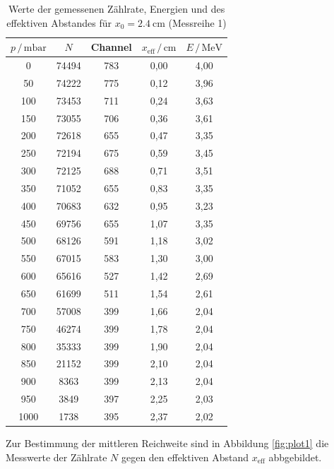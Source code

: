 \begin{table}
  \centering
  \caption{Werte der gemessenen Zählrate, Energien und des effektiven Abstandes für 
            $x_0 = \SI{2.4}{\centi\meter}$ (Messreihe 1)}
  \label{tab:mess1}
  \begin{tabular}{c c c c c}
  \toprule
  $p \,/\, \si{\milli\bar}$ & $N$ & Channel & $x_\text{eff} \,/\, \si {\centi\meter}$ & 
  $E \,/\, \si{\mega\eV}$\\
  \midrule 
         0 & 74494 & 783 & 0,00 & 4,00 \\
        50 & 74222 & 775 & 0,12 & 3,96 \\
       100 & 73453 & 711 & 0,24 & 3,63 \\
       150 & 73055 & 706 & 0,36 & 3,61 \\
       200 & 72618 & 655 & 0,47 & 3,35 \\
       250 & 72194 & 675 & 0,59 & 3,45 \\
       300 & 72125 & 688 & 0,71 & 3,51 \\
       350 & 71052 & 655 & 0,83 & 3,35 \\
       400 & 70683 & 632 & 0,95 & 3,23 \\
       450 & 69756 & 655 & 1,07 & 3,35 \\
       500 & 68126 & 591 & 1,18 & 3,02 \\
       550 & 67015 & 583 & 1,30 & 3,00 \\
       600 & 65616 & 527 & 1,42 & 2,69 \\
       650 & 61699 & 511 & 1,54 & 2,61 \\
       700 & 57008 & 399 & 1,66 & 2,04 \\
       750 & 46274 & 399 & 1,78 & 2,04 \\
       800 & 35333 & 399 & 1,90 & 2,04 \\
       850 & 21152 & 399 & 2,10 & 2,04 \\
       900 &  8363 & 399 & 2,13 & 2,04 \\
       950 &  3849 & 397 & 2,25 & 2,03 \\
      1000 &  1738 & 395 & 2,37 & 2,02 \\
  \bottomrule
  \end{tabular}
  \end{table}

Zur Bestimmung der mittleren Reichweite sind in Abbildung \ref{fig:plot1} die Messwerte der Zählrate $N$ 
gegen den effektiven Abstand $x_\text{eff}$ abbgebildet.

